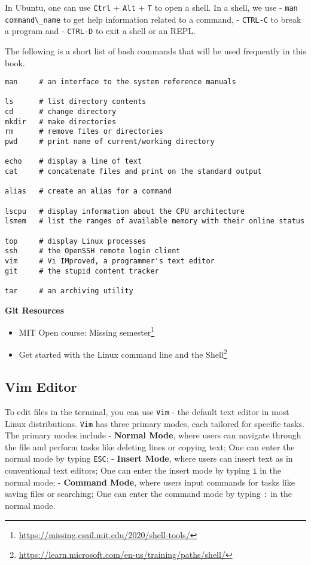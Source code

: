 \documentclass[
  notoc %
]{tufte-book}
\DeclareRobustCommand{\href}[2]{#2\footnote{\url{#1}}}
\providecommand{\tightlist}{%
  \setlength{\itemsep}{0pt}\setlength{\parskip}{0pt}
}
\newcommand{\passthrough}[1]{#1}
\begin{document}
In Ubuntu, one can use \passthrough{\lstinline!Ctrl!} +
\passthrough{\lstinline!Alt!} + \passthrough{\lstinline!T!} to open a
shell. In a shell, we use - \passthrough{\lstinline!man command\_name!}
to get help information related to a command, -
\passthrough{\lstinline!CTRL-C!} to break a program and -
\passthrough{\lstinline!CTRL-D!} to exit a shell or an REPL.

The following is a short list of bash commands that will be used
frequently in this book.

\begin{lstlisting}
man     # an interface to the system reference manuals

ls      # list directory contents
cd      # change directory
mkdir   # make directories
rm      # remove files or directories
pwd     # print name of current/working directory

echo    # display a line of text
cat     # concatenate files and print on the standard output

alias   # create an alias for a command

lscpu   # display information about the CPU architecture
lsmem   # list the ranges of available memory with their online status

top     # display Linux processes
ssh     # the OpenSSH remote login client
vim     # Vi IMproved, a programmer's text editor
git     # the stupid content tracker

tar     # an archiving utility
\end{lstlisting}

\textbf{Git Resources}

\begin{itemize}
\tightlist
\item
  \href{https://missing.csail.mit.edu/2020/shell-tools/}{MIT Open
  course: Missing semester}
\item
  \href{https://learn.microsoft.com/en-us/training/paths/shell/}{Get
  started with the Linux command line and the Shell}
\end{itemize}

\hypertarget{sec:editor}{%
\subsection{Vim Editor}\label{sec:editor}}

To edit files in the terminal, you can use \passthrough{\lstinline!Vim!}
- the default text editor in most Linux distributions.
\passthrough{\lstinline!Vim!} has three primary modes, each tailored for
specific tasks. The primary modes include - \textbf{Normal Mode}, where
users can navigate through the file and perform tasks like deleting
lines or copying text; One can enter the normal mode by typing
\passthrough{\lstinline!ESC!}; - \textbf{Insert Mode}, where users can
insert text as in conventional text editors; One can enter the insert
mode by typing \passthrough{\lstinline!i!} in the normal mode; -
\textbf{Command Mode}, where users input commands for tasks like saving
files or searching; One can enter the command mode by typing
\passthrough{\lstinline!:!} in the normal mode.
\end{document}
